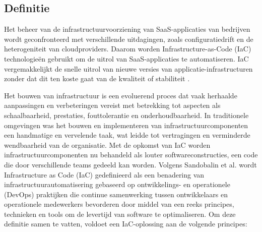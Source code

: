 \subsection{Definitie}
\label{Definitie}
Het beheer van de infrastructuurvoorziening van SaaS-applicaties van bedrijven wordt geconfronteerd met verschillende uitdagingen, zoals configuratiedrift en de heterogeniteit van cloudproviders. Daarom worden Infrastructure-as-Code (IaC) technologieën gebruikt om de uitrol van SaaS-applicaties te automatiseren. IaC vergemakkelijkt de snelle uitrol van nieuwe versies van applicatie-infrastructuren zonder dat dit ten koste gaat van de kwaliteit of stabiliteit \autocite{Achar2021}.
\par
Het bouwen van infrastructuur is een evoluerend proces dat vaak herhaalde aanpassingen en verbeteringen vereist met betrekking tot aspecten als schaalbaarheid, prestaties, fouttolerantie en onderhoudbaarheid. In traditionele omgevingen was het bouwen en implementeren van infrastructuurcomponenten een handmatige en vervelende taak, wat leidde tot vertragingen en verminderde wendbaarheid van de organisatie. Met de opkomst van IaC worden infrastructuurcomponenten nu behandeld als louter softwareconstructies,  een code die door verschillende teams gedeeld kan worden. Volgens Sandobalin et al. wordt Infrastructure as Code (IaC) gedefinieerd als een benadering van infrastructuurautomatisering gebaseerd op ontwikkelings- en operationele (DevOps) praktijken die continue samenwerking tussen ontwikkelaars en operationele medewerkers bevorderen door middel van een reeks principes, technieken en tools om de levertijd van software te optimaliseren. Om deze definitie samen te vatten, voldoet een IaC-oplossing aan de volgende principes:
